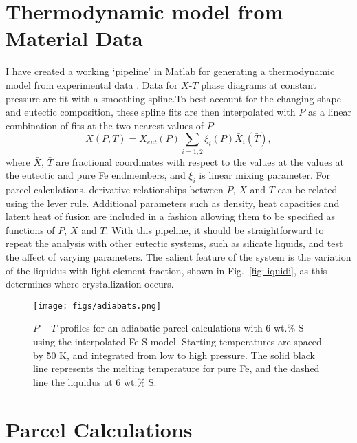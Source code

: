 \section{Thermodynamic model from Material Data}

I have created a working `pipeline' in Matlab for generating a thermodynamic model from
experimental data \citep{Brett1969,Fei1997,Chen2008,Stewart2007}. Data for 
$X$-$T$ phase diagrams at constant
pressure are fit with a smoothing-spline.To best account for the changing
shape and eutectic composition, these spline fits are then
interpolated with $P$ as a linear combination of fits at the two nearest
values of $P$
\begin{equation}
  X(P,T) = X_{eut}(P)\sum_{i=1,2}\xi_i(P)\bar{X}_i(\bar{T}),
\end{equation}
where $\bar{X}$, $\bar{T}$ are fractional coordinates with respect to the
values at the values at the eutectic and pure Fe endmembers, and $\xi_i$
is linear mixing parameter. For parcel
calculations, derivative relationships between $P$, $X$ and $T$ can be related
using the lever rule. Additional parameters such as density, heat capacities
and latent heat of fusion are included in a fashion allowing them to be
specified as functions of $P$, $X$ and $T$. With this pipeline, it should be
straightforward to repeat the analysis with other eutectic systems, such as
silicate liquids, and test the affect of varying parameters.
The salient feature of the system is the variation of the
liquidus with light-element fraction, shown in Fig.~\ref{fig:liquidi}, as this
determines where crystallization occurs.

 \begin{figure}[h] %
   \centering
   \texttt{[image: figs/adiabats.png]} 
   \caption{$P-T$ profiles for an adiabatic parcel calculations with 6 wt.\% S using the interpolated Fe-S model. Starting 
   temperatures are spaced by 50 K, and integrated from low to high pressure. The solid black line represents 
   the melting temperature for pure Fe, and the dashed line the liquidus at 6 wt.\% S.}
   \label{fig:adiabats}
\end{figure}


\section{Parcel Calculations}


